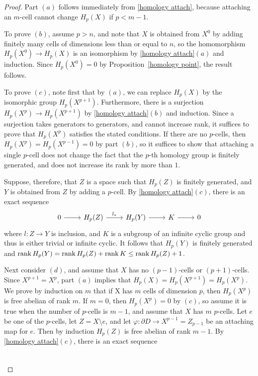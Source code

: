 \begin{proof}
Part $(a)$ follows immediately from \cref{homology attach}, because attaching an $m$-cell cannot change $H_p(X)$ if $p<m-1$.\par
To prove $(b)$, assume $p>n$, and note that $X$ is obtained from $X^0$ by adding finitely many cells of dimensions less than or equal to $n$, so the homomorphism $H_p(X^0)\to H_p(X)$ is an isomorphism by \cref{homology attach}$(a)$ and induction. Since $H_p(X^0)=0$ by Proposition~\ref{homology point}, the result follows.\par
To prove $(c)$, note first that by $(a)$, we can replace $H_p(X)$ by the isomorphic group $H_p(X^{p+1})$. Furthermore, there is a surjection $H_p(X^p)\to H_p(X^{p+1})$ by \cref{homology attach}$(b)$ and induction. Since a surjection takes generators to generators, and cannot increase rank, it suffices to prove that $H_p(X^p)$ satisfies the stated conditions. If there are no $p$-cells, then $H_p(X^p)=H_p(X^{p-1})=0$ by part $(b)$, so it suffices to show that attaching a single $p$-cell does not change the fact that the $p$-th homology group is finitely generated, and does not increase its rank
by more than $1$.\par
Suppose, therefore, that $Z$ is a space such that $H_p(Z)$ is finitely generated, and $Y$ is obtained from $Z$ by adding a $p$-cell. By \cref{homology attach}$(c)$, there is an exact
sequence
\[\begin{tikzcd}
0\ar[r]&H_p(Z)\ar[r,"l_*"]&H_p(Y)\ar[r]&K\ar[r]&0
\end{tikzcd}\]
where $l:Z\to Y$ is inclusion, and $K$ is a subgroup of an infinite cyclic group and thus is either trivial or infinite cyclic. It follows that $H_p(Y)$ is finitely 
generated and $\mathrm{rank}\, H_p(Y)=\mathrm{rank}\, H_p(Z)+\mathrm{rank}\, K\leq\mathrm{rank}\, H_p(Z)+1$.\par
Next consider $(d)$, and assume that $X$ has no $(p-1)$-cells or $(p+1)$-cells. Since $X^{p+1}=X^p$, part $(a)$ implies that $H_p(X)=H_p(X^{p+1})=H_p(X^p)$. We prove 
by induction on $m$ that if X has $m$ cells of dimension $p$, then $H_p(X^p)$ is free abelian of rank $m$. If $m=0$, then $H_p(X^p)=0$ by $(c)$, so assume it is true 
when the number of $p$-cells is $m-1$, and assume that $X$ has $m$ $p$-cells. Let $e$ be one of the $p$-cells, let $Z=X\setminus e$, and let 
$\varphi:\partial D\to X^{p-1}=Z_{p-1}$ be an attaching map for $e$. Then by induction $H_p(Z)$ is free abelian of rank $m-1$. By \cref{homology attach}$(c)$, 
there is an exact sequence
\[\begin{tikzcd}

\end{tikzcd}\]
\end{proof}
